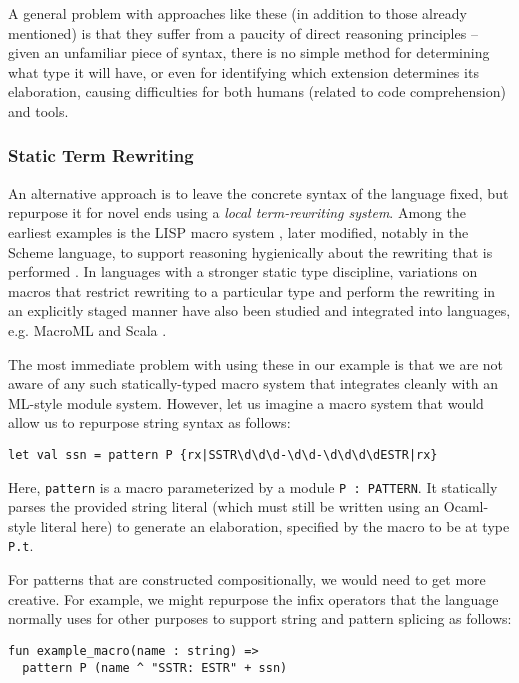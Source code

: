 A general problem with approaches like these (in addition to those already mentioned) is that they  suffer from a paucity of direct reasoning principles -- given an unfamiliar piece of syntax, there is no simple method for determining what type it will have, or even for identifying which extension determines its elaboration, causing difficulties for both humans (related to code comprehension) and tools.

\subsubsection{Static Term Rewriting}\label{sec:term-rewriting}
An alternative approach is to leave the concrete syntax of the language fixed, but repurpose it for novel ends using a \emph{local term-rewriting system}. Among the earliest examples is the LISP macro system \cite{Hart63a}, later modified, notably in the Scheme language, to support reasoning hygienically about the rewriting that is performed \cite{Kohlbecker86a}. In languages with a stronger static type discipline, variations on macros that restrict rewriting to a particular type and perform the rewriting in an explicitly staged manner have also been studied \cite{Herman10:Theory,ganz2001macros} and integrated into languages, e.g. MacroML \cite{ganz2001macros} and Scala \cite{ScalaMacros2013}. 

The most immediate problem with using these in our example is that we are not aware of any such statically-typed macro system that integrates cleanly with an ML-style module system. However, let us imagine a macro system that would allow us to repurpose string syntax  as follows:
\begin{lstlisting}[numbers=none]
let val ssn = pattern P {rx|SSTR\d\d\d-\d\d-\d\d\d\dESTR|rx}
\end{lstlisting}

Here, \lstinline{pattern} is a macro parameterized by a module \lstinline{P : PATTERN}. It statically parses the provided string literal (which must still be written using an Ocaml-style literal here) to generate an elaboration, specified by the macro to be at type \lstinline{P.t}. 

For patterns that are constructed compositionally, we would need to get more creative. For example, we might repurpose the infix operators that the language normally uses for other purposes to support string and pattern splicing as follows:

\begin{lstlisting}[numbers=none,escapechar=|]
fun example_macro(name : string) => 
  pattern P (name ^ "SSTR: ESTR" + ssn)
\end{lstlisting}

